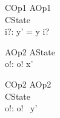 \begin{schema}{COp1}
\zfsrefines AOp1\\
   \Delta CState \\
   i?: \nat
\where
   y' = y \cat \langle i? \rangle
\end{schema}

\begin{schema}{AOp2}
   \Xi AState \\
   o!: \nat
\where
    o! \in  x'
\end{schema}

\begin{schema}{COp2}
\zfsrefines AOp2\\
   \Xi CState \\
   o!: \nat
\where
   o! \in \ran~y'
\end{schema}
